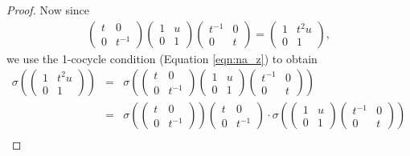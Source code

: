 \begin{proof}
Now since
\begin{eqnarray}
\left(\begin{matrix}
t & 0 \\ 0 & t^{-1}
\end{matrix}\right)
\left(\begin{matrix}
1 & u \\ 0 & 1
\end{matrix}\right)
\left(\begin{matrix}
t^{-1} & 0 \\ 0 & t
\end{matrix}\right)
=
\left(\begin{matrix}
1 & t^2u \\ 0 & 1
\end{matrix}\right),
\label{eqn:tut}
\end{eqnarray}
we use the 1-cocycle condition (Equation \ref{eqn:na_z}) to obtain
\begin{eqnarray*}
\sigma\left(
\left(\begin{matrix}
1 & t^2u \\ 0 & 1
\end{matrix}\right)
\right)
&=&\sigma\left(
\left(\begin{matrix}
t & 0 \\ 0 & t^{-1}
\end{matrix}\right)
\left(\begin{matrix}
1 & u \\ 0 & 1
\end{matrix}\right)
\left(\begin{matrix}
t^{-1} & 0 \\ 0 & t
\end{matrix}\right)
\right)\\
&=&
\sigma\left(
\left(\begin{matrix}
t & 0 \\ 0 & t^{-1}
\end{matrix}\right)
\right)
\left(\begin{matrix}
t & 0 \\ 0 & t^{-1}
\end{matrix}\right) \cdot
\sigma\left(
\left(\begin{matrix}
1 & u \\ 0 & 1
\end{matrix}\right)
\left(\begin{matrix}
t^{-1} & 0 \\ 0 & t
\end{matrix}\right)
\right)\\

\end{eqnarray*}
\end{proof}
